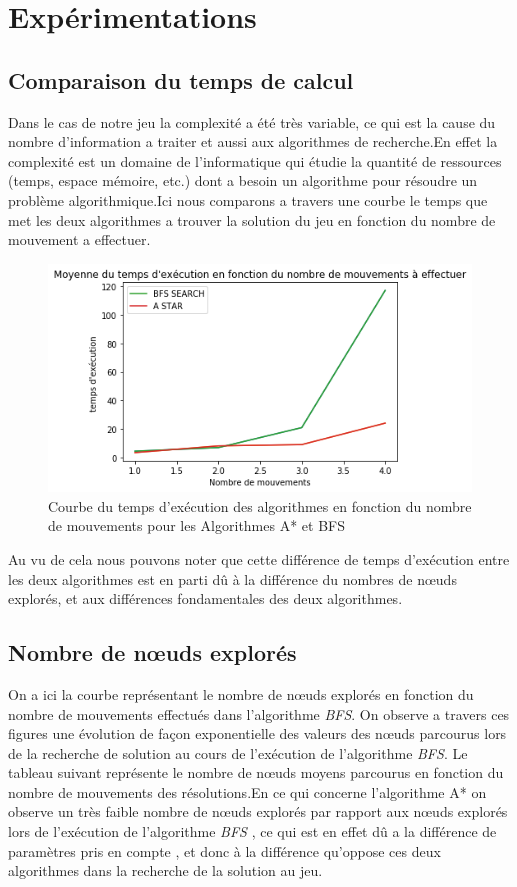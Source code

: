 \documentclass[a4paper]{article} %
\begin{document}
\section{Expérimentations}
	\subsection{Comparaison du temps de calcul}
	
	
Dans le cas de notre jeu la complexité a été très variable, ce qui est la cause du nombre d'information a traiter et aussi aux algorithmes de recherche.En effet  la complexité est un domaine de l'informatique qui étudie la quantité de ressources (temps, espace mémoire, etc.) dont a besoin un algorithme pour résoudre un problème algorithmique.Ici nous comparons a travers une courbe le temps que met les deux algorithmes a trouver la solution du jeu en fonction du nombre de mouvement a effectuer.	
	\begin{figure}[h]
	\begin{center}
	\includegraphics[scale=0.37]{./images/time.png}
	\caption{Courbe du temps d’exécution des algorithmes  en fonction du  nombre de mouvements pour les Algorithmes A* et BFS}
	\end{center}
\end{figure}
\newline
Au vu de cela nous pouvons noter que cette différence de temps d’exécution entre les deux algorithmes est en parti dû  à la différence du  nombres de nœuds explorés, et aux différences fondamentales des deux algorithmes.

	
	\subsection{Nombre de nœuds explorés}
On a ici la courbe représentant le nombre de nœuds explorés en fonction du nombre de mouvements effectués dans l'algorithme \textsl{BFS}. On observe a travers ces figures une évolution de façon exponentielle des valeurs des nœuds parcourus lors de la recherche de solution au cours de l’exécution de l'algorithme \textsl{BFS}. Le tableau suivant représente le nombre de nœuds moyens parcourus en fonction du nombre de mouvements des résolutions.En ce qui concerne l'algorithme A* on observe un très faible nombre de nœuds explorés par rapport aux nœuds explorés lors de l’exécution de l'algorithme \textsl{BFS} , ce qui est en effet dû a la différence de paramètres pris en compte , et donc à la différence qu'oppose ces deux algorithmes dans la recherche de la solution au jeu. 
\end{document}
